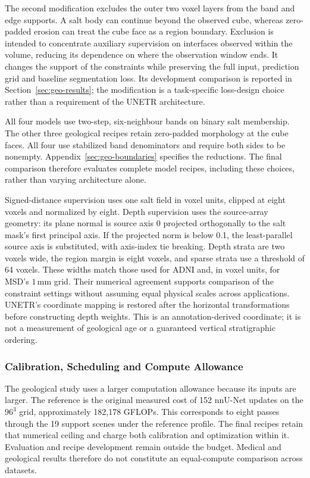 \documentclass[12pt,a4paper]{article}
\begin{document}
The second modification excludes the outer two voxel layers from the
band and edge supports. A salt body can continue beyond the observed
cube, whereas zero-padded erosion can treat the cube face as a region
boundary. Exclusion is intended to concentrate auxiliary supervision
on interfaces observed within the volume, reducing its dependence on
where the observation window ends. It changes the support of the
constraints while preserving the full input, prediction grid and
baseline segmentation loss. Its development comparison is reported in
Section~\ref{sec:geo-results}; the modification is a task-specific
loss-design choice rather than a requirement of the UNETR architecture.

All four models use two-step, six-neighbour bands on binary salt
membership. The other three geological recipes retain zero-padded
morphology at the cube faces. All four use stabilized band denominators
and require both sides to be nonempty.
Appendix~\ref{sec:geo-boundaries} specifies the reductions. The final
comparison therefore evaluates complete model recipes, including these
choices, rather than varying architecture alone.

Signed-distance supervision uses one salt field in voxel units, clipped
at eight voxels and normalized by eight. Depth supervision uses the
source-array geometry: its plane normal is source axis 0 projected
orthogonally to the salt mask's first principal axis. If the projected
norm is below 0.1, the least-parallel source axis is substituted, with
axis-index tie breaking. Depth strata are two voxels wide, the region
margin is eight voxels, and sparse strata use a threshold of 64 voxels.
These widths match those used for ADNI and, in voxel units, for MSD's
$1\,\mathrm{mm}$ grid. Their numerical agreement supports comparison of
the constraint settings without assuming equal physical scales across
applications.
UNETR's coordinate mapping is restored after the horizontal transformations before
constructing depth weights. This is an annotation-derived coordinate;
it is not a measurement of geological age or a guaranteed vertical
stratigraphic ordering.

\subsubsection{Calibration, Scheduling and Compute Allowance}

The geological study uses a larger computation allowance because its
inputs are larger. The reference is the original measured cost of 152
nnU-Net updates on the $96^3$ grid, approximately 182,178 GFLOPs. This
corresponds to eight passes through the 19 support scenes under the
reference profile. The final recipes retain that numerical ceiling and
charge both calibration and optimization within it. Evaluation and recipe
development remain outside the budget. Medical and geological results
therefore do not constitute an equal-compute comparison across datasets.
\end{document}
